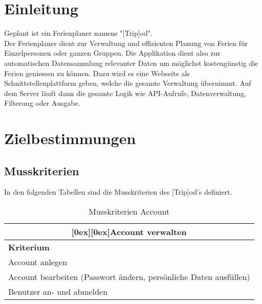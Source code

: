 \documentclass[10pt,a4paper,titlepage,twoside,german,final]{zhawreprt}
\newcommand{\tableheader}[2]{\multicolumn{#1}{c}{\raisebox{-0.3em}[0ex][0ex]{\large{\textbf{#2}}}}}
\numberwithin{table}{chapter}
\begin{document}

\tableofcontents

\chapter{Einleitung}\label{chp:Introduction}
Geplant ist ein Ferienplaner namens "[Trip]od".\\
Der Ferienplaner dient zur Verwaltung und effizienten Planung von Ferien für Einzelpersonen oder ganzen Gruppen. Die Applikation dient also zur automatischen Datensammlung relevanter Daten um möglichst kostengünstig die Ferien geniessen zu können. Dazu wird es eine Webseite als Schnittstellenplattform geben, welche die gesamte Verwaltung übernimmt. Auf dem Server läuft dann die gesamte Logik wie API-Aufrufe, Datenverwaltung, Filterung oder Ausgabe.
\chapter{Zielbestimmungen}\label{chp:DefinitionOfGoals}
\section{Musskriterien}\label{sec:MustCriteria}
In den folgenden Tabellen sind die Musskriterien des [Trip]od's definiert.
\begin{table}[ht]\centering
\begin{tabular}{l}\hline
\tableheader{1}{Account verwalten}\\[0.3em]\hline
\textbf{Kriterium}\\\hline
Account anlegen\\\hline
Account bearbeiten (Passwort ändern, persönliche Daten ausfüllen)\\\hline
Benutzer an- und abmelden\\\hline
\end{tabular}
\caption{Musskriterien Account}\label{tbl:MustAccount}
\end{table}
\end{document}
